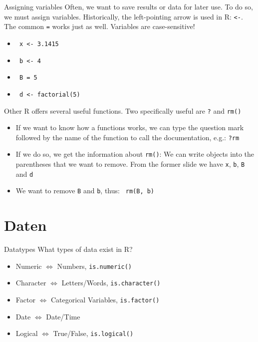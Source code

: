 \documentclass[aspectratio = 169]{chariteBeamer}
\begin{document}
\begin{frame}[fragile]{Assigning variables}
Often, we want to save results or data for later use. To do so, we must assign variables. Historically, the left-pointing arrow is used in R: \verb+<-+. The common \verb+=+ works just as well. Variables are case-sensitive!
\begin{itemize}
	\item \verb+ x <- 3.1415+
	\item \verb+ b <- 4+
	\item \verb+ B = 5+
	\item \verb+ d <- factorial(5)+
\end{itemize}
\end{frame}

\begin{frame}[fragile]{Other}
R offers several useful functions. Two specifically useful are \verb+?+ and \verb+rm()+
\begin{itemize}
	\item If we want to know how a functions works, we can type the question mark followed by the name of the function to call the documentation, e.g.: \verb+?rm+
	\item If we do so, we get the information about \verb+rm()+: We can write objects into the parentheses that we want to remove. From the former slide we have \verb+x+, \verb+b+, \verb+B+ and \verb+d+
	\item We want to remove \verb+B+ and \verb+b+, thus: \verb+ rm(B, b)+
\end{itemize}
\end{frame}

\section{Daten}
\begin{frame}[fragile]{Datatypes}
	What types of data exist in R?
	\begin{itemize}
		\item Numeric $\Leftrightarrow$ Numbers, \verb+is.numeric()+
		\item Character $\Leftrightarrow$ Letters/Words, \verb+is.character()+
		\item Factor $\Leftrightarrow$ Categorical Variables, \verb+is.factor()+
		\item Date $\Leftrightarrow$ Date/Time
		\item Logical $\Leftrightarrow$ True/False, \verb+is.logical()+
	\end{itemize}
\end{frame}
\end{document}

